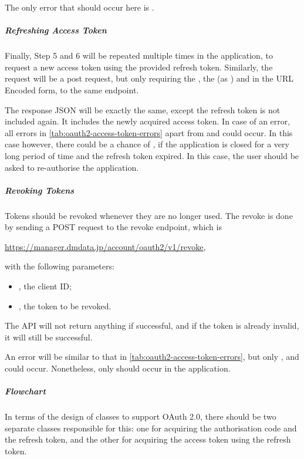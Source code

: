 The only error that should occur here is .

\subparagraph{Refreshing Access Token}

Finally, Step 5 and 6 will be repeated multiple times in the application, to request a new access token using the provided refresh token. Similarly, the request will be a post request, but only requiring the , the  (as ) and  in the URL Encoded form, to the same endpoint.

The response JSON will be exactly the same, except the refresh token is not included again. It includes the newly acquired access token. In case of an error, all errors in \autoref{tab:oauth2-access-token-errors} apart from  and  could occur. In this case however, there could be a chance of , if the application is closed for a very long period of time and the refresh token expired. In this case, the user should be asked to re-authorise the application.

\subparagraph{Revoking Tokens}

Tokens should be revoked whenever they are no longer used. The revoke is done by sending a POST request to the revoke endpoint, which is
\begin{center}
    \url{https://manager.dmdata.jp/account/oauth2/v1/revoke},
\end{center}
with the following parameters:
\begin{itemize}
    \item {}, the client ID;
    \item {}, the token to be revoked.
\end{itemize}

The API will not return anything if successful, and if the token is already invalid, it will still be successful.

An error will be similar to that in \autoref{tab:oauth2-access-token-errors}, but only ,  and  could occur. Nonetheless, only  should occur in the application.

\subparagraph{Flowchart}

In terms of the design of classes to support OAuth 2.0, there should be two separate classes responsible for this: one for acquiring the authorisation code and the refresh token, and the other for acquiring the access token using the refresh token.

